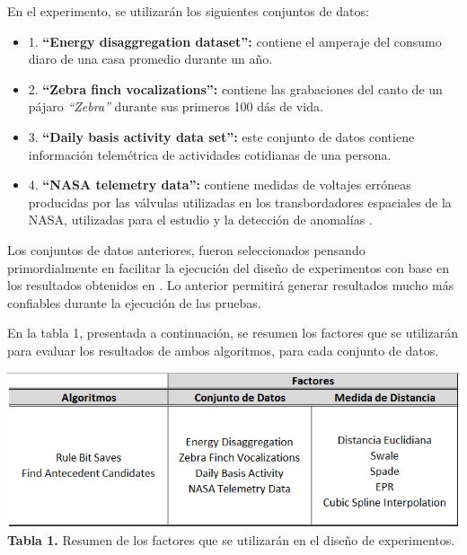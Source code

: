 \begin{itemize}
En el experimento, se utilizar\'an los siguientes conjuntos de datos:
\begin{itemize}
\item 1. \textbf{\enquote{Energy disaggregation dataset}:} contiene el amperaje del consumo diaro de una casa promedio durante un a\~no.
\item 2. \textbf{\enquote{Zebra finch vocalizations}:} contiene las grabaciones del canto de un p\'ajaro \textit{\enquote{Zebra}} durante sus primeros 100 d\'as de vida.
\item 3. \textbf{\enquote{Daily basis activity data set}:} este conjunto de datos contiene informaci\'on telem\'etrica de actividades cotidianas de una persona.
\item 4. \textbf{\enquote{NASA telemetry data}:} contiene medidas de voltajes err\'oneas producidas por las v\'alvulas utilizadas en los transbordadores espaciales de la NASA, utilizadas para el estudio y la detecci\'on de anomal\'ias .
\end{itemize}
\end{itemize}
Los conjuntos de datos anteriores, fueron seleccionados pensando primordialmente en facilitar la ejecuci\'on del dise\~no de experimentos con base en los resultados obtenidos en \cite{main}. Lo anterior permitir\'a generar resultados mucho m\'as confiables durante la ejecuci\'on de las pruebas.\par
En la tabla 1, presentada a continuaci\'on, se resumen los factores que se utilizar\'an para evaluar los resultados de ambos algoritmos, para cada conjunto de datos.
\begin{center}
\includegraphics[scale=0.7]{factors.png}\\
\vspace*{10pt}
\footnotesize{\textbf{Tabla 1.} Resumen de los factores que se utilizar\'an en el dise\~no de experimentos.}
\end{center}

